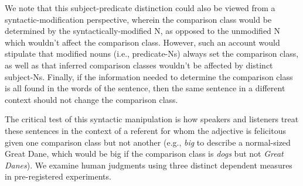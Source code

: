 \documentclass[10pt,letterpaper]{article}
\begin{document}
We note that this subject-predicate distinction could also be viewed from a syntactic-modification perspective, wherein the comparison class would be determined by the syntactically-modified N, as opposed to the unmodified N which wouldn't affect the comparison class. However, such an account would stipulate that modified nouns (i.e., predicate-Ns) always set the comparison class, as well as that inferred comparison classes wouldn't be affected by distinct subject-Ns. Finally, if the information needed to determine the comparison class is all found in the words of the sentence, then the same sentence in a different context should not change the comparison class. 

The critical test of this syntactic manipulation is how speakers and listeners treat these sentences in the context of a referent for whom the adjective is felicitous given one comparison class but not another (e.g., \emph{big} to describe a normal-sized Great Dane, which would be big if the comparison class is \emph{dogs} but not \emph{Great Danes}). 
We examine human judgments using three distinct dependent measures in pre-registered experiments. 



\end{document}
